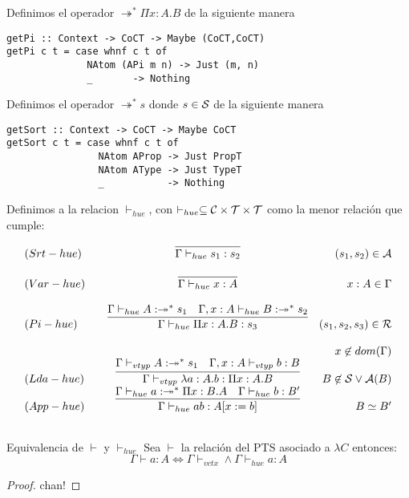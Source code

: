\begin{definition}
Definimos el operador $\twoheadrightarrow^{*} \Pi x:A.B$ de la siguiente manera

\begin{verbatim}
getPi :: Context -> CoCT -> Maybe (CoCT,CoCT)
getPi c t = case whnf c t of
              NAtom (APi m n) -> Just (m, n)
              _       -> Nothing
\end{verbatim}

Definimos el operador $\twoheadrightarrow^{*} s$ donde $s\in\mathcal{S}$ de la siguiente manera

\begin{verbatim}
getSort :: Context -> CoCT -> Maybe CoCT
getSort c t = case whnf c t of
                NAtom AProp -> Just PropT
                NAtom AType -> Just TypeT
                _           -> Nothing

\end{verbatim}
\end{definition}



\begin{definition}
Definimos a la relacion $\vdash_{hue}$, con $\vdash_{hue} \subseteq \mathcal{C}\times\mathcal{T}\times\mathcal{T}$ como
la menor relación que cumple:


\[
\begin{array}{llcr}
	(Srt-hue) & &\infer{\Gamma \vdash_{hue} s_{1} : s_{2}}{} & (s_{1},s_{2}) \in\cA \\ \\ 
	(Var-hue) & &\infer{\Gamma \vdash_{hue} x : A}{} & x:A \in\Gamma \\ \\

	(Pi-hue)  & &\infer{\Gamma \vdash_{hue} \Pi x:A.B : s_{3}}{\Gamma\vdash_{hue} A:\twoheadrightarrow^{*} s_{1} & \Gamma, x:A \vdash_{hue} B:\twoheadrightarrow^{*}s_{2}} &  (s_1,s_2,s_3)\in\cR\\ \\
               & &                                             & x \not\in dom(\Gamma)\\
	(Lda-hue) & &\infer{\Gamma \vdash_{vtyp} \lambda a:A.b : \Pi x:A.B }{\Gamma\vdash_{vtyp} A:\twoheadrightarrow^{*} s_{1} & \Gamma, x:A \vdash_{vtyp} b: B
} & B \not\in\cS \lor \cA(B) \\
	(App-hue) & &\infer{\Gamma \vdash_{hue} a b : A[x:= b] }{\Gamma\vdash_{hue} a :\twoheadrightarrow^{*} \Pi x:B.A & \Gamma \vdash_{hue} b:B'} &  B\simeq B' \\ \\
	
\end{array}
\]

\end{definition}

\begin{lemma}{Equivalencia de $\vdash$ y $\vdash_{hue}$}
Sea $\vdash$ la relación del PTS asociado a $\lambda C$  entonces:
\begin{equation}
\Gamma \vdash a : A \Leftrightarrow \Gamma \vdash_{vctx} \land \Gamma \vdash_{hue} a:A
\end{equation}
\end{lemma}

\begin{proof}
chan!
\end{proof}

